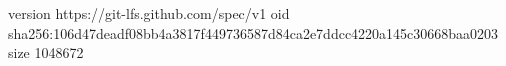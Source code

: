 version https://git-lfs.github.com/spec/v1
oid sha256:106d47deadf08bb4a3817f449736587d84ca2e7ddcc4220a145c30668baa0203
size 1048672
